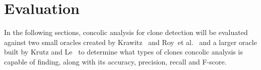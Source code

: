 \documentclass{sig-alternate}
\newcommand{\todo}[1]{\textcolor{cyan}{\textbf{[#1]}}}
\begin{document}






\section{Evaluation}
\label{sec: evaluation}


In the following sections, concolic analysis for clone detection will be evaluated against two small oracles created by Krawitz~\cite{Kraw2012} and Roy~et al.~\cite{Roy:2009:CEC:1530898.1531101} and a larger oracle built by Krutz and Le~\cite{Krutz:2014:CCO:2597073.2597127} to determine what types of clones concolic analysis is capable of finding, along with its accuracy, precision, recall and F-score.
\end{document}
